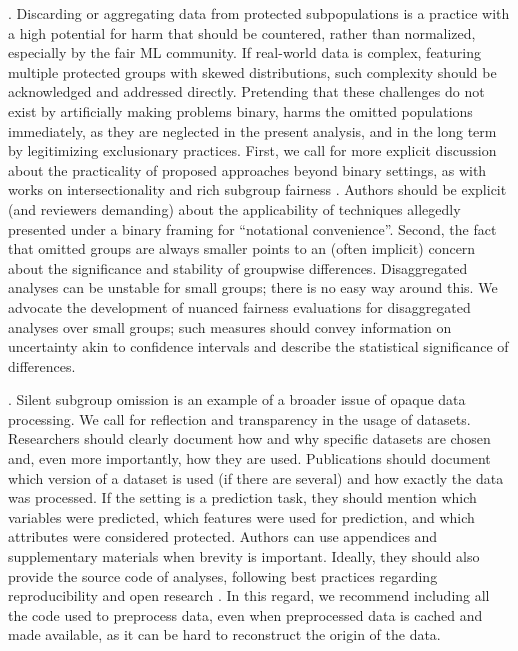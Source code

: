 . Discarding or aggregating data from protected subpopulations is a practice with a high potential for harm that should be countered, rather than normalized, especially by the fair ML community. If real-world data is complex, featuring multiple protected groups with skewed distributions, such complexity should be acknowledged and addressed directly. Pretending that these challenges do not exist by artificially making problems binary, harms the omitted populations immediately, as they are neglected in the present analysis, and in the long term by legitimizing exclusionary practices. First, we call for more explicit discussion about the practicality of proposed approaches beyond binary settings, as with works on intersectionality and rich subgroup fairness \citep{kearns2019empirical,wang2022towards}. Authors should be explicit (and reviewers demanding) about the applicability of techniques allegedly presented under a binary framing for ``notational convenience''. Second, the fact that omitted groups are always smaller points to an (often implicit) concern about the significance and stability of groupwise differences. Disaggregated analyses can be unstable for small groups; there is no easy way around this. We advocate the development of nuanced fairness evaluations for disaggregated analyses over small groups; such measures should convey information on uncertainty akin to confidence intervals and describe the statistical significance of differences.


. Silent subgroup omission is an example of a broader issue of opaque data processing. We call for reflection and transparency in the usage of datasets. Researchers should clearly document how and why specific datasets are chosen and, even more importantly, how they are used. Publications should document which version of a dataset is used (if there are several) and how exactly the data was processed. If the setting is a prediction task, they should mention which variables were predicted, which features were used for prediction, and which attributes were considered protected. Authors can use appendices and supplementary materials when brevity is important. Ideally, they should also provide the source code of analyses, following best practices regarding reproducibility and open research \citep{munafo2017manifesto,nosek2015promoting}. In this regard, we recommend including all the code used to preprocess data, even when preprocessed data is cached and made available, as it can be hard to reconstruct the origin of the data.



